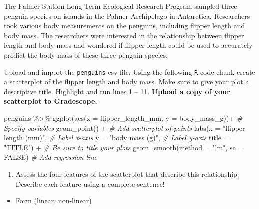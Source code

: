 \documentclass[
]{report}
\newenvironment{Shaded}{\begin{snugshade}}{\end{snugshade}}
\newcommand{\AttributeTok}[1]{\textcolor[rgb]{0.77,0.63,0.00}{#1}}
\newcommand{\CommentTok}[1]{\textcolor[rgb]{0.56,0.35,0.01}{\textit{#1}}}
\newcommand{\ConstantTok}[1]{\textcolor[rgb]{0.00,0.00,0.00}{#1}}
\newcommand{\FunctionTok}[1]{\textcolor[rgb]{0.00,0.00,0.00}{#1}}
\newcommand{\NormalTok}[1]{#1}
\newcommand{\SpecialCharTok}[1]{\textcolor[rgb]{0.00,0.00,0.00}{#1}}
\newcommand{\StringTok}[1]{\textcolor[rgb]{0.31,0.60,0.02}{#1}}
\providecommand{\tightlist}{%
  \setlength{\itemsep}{0pt}\setlength{\parskip}{0pt}}
\begin{document}
The Palmer Station Long Term Ecological Research Program sampled three penguin species on islands in the Palmer Archipelago in Antarctica. Researchers took various body measurements on the penguins, including flipper length and body mass. The researchers were interested in the relationship between flipper length and body mass and wondered if flipper length could be used to accurately predict the body mass of these three penguin species.

Upload and import the \texttt{penguins} csv file. Using the following \texttt{R} code chunk create a scatterplot of the flipper length and body mass. Make sure to give your plot a descriptive title. Highlight and run lines 1 -- 11. \textbf{Upload a copy of your scatterplot to Gradescope.}

\begin{Shaded}
\begin{Highlighting}[]
\NormalTok{penguins }\SpecialCharTok{\%\textgreater{}\%}
  \FunctionTok{ggplot}\NormalTok{(}\FunctionTok{aes}\NormalTok{(}\AttributeTok{x =}\NormalTok{ flipper\_length\_mm, }\AttributeTok{y =}\NormalTok{ body\_mass\_g))}\SpecialCharTok{+}  \CommentTok{\# Specify variables}
  \FunctionTok{geom\_point}\NormalTok{() }\SpecialCharTok{+}  \CommentTok{\# Add scatterplot of points}
  \FunctionTok{labs}\NormalTok{(}\AttributeTok{x =} \StringTok{"flipper length (mm)"}\NormalTok{,  }\CommentTok{\# Label x{-}axis}
       \AttributeTok{y =} \StringTok{"body mass (g)"}\NormalTok{,  }\CommentTok{\# Label y{-}axis}
       \AttributeTok{title =} \StringTok{"TITLE"}\NormalTok{) }\SpecialCharTok{+} \CommentTok{\# Be sure to title your plots}
  \FunctionTok{geom\_smooth}\NormalTok{(}\AttributeTok{method =} \StringTok{"lm"}\NormalTok{, }\AttributeTok{se =} \ConstantTok{FALSE}\NormalTok{)  }\CommentTok{\# Add regression line}
\end{Highlighting}
\end{Shaded}

\begin{enumerate}
\def\labelenumi{\arabic{enumi}.}
\tightlist
\item
  Assess the four features of the scatterplot that describe this relationship. Describe each feature using a complete sentence!
\end{enumerate}

\begin{itemize}
\tightlist
\item
  Form (linear, non-linear)
\end{itemize}
\end{document}
